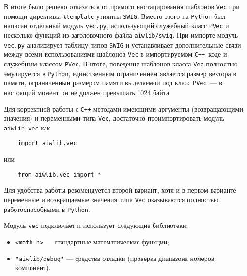 В итоге было решено отказаться от прямого инстацирования шаблонов \verb'Vec' при помощи директивы \verb'%template'
утилиты \verb'SWIG'. Вместо этого на \verb'Python' был написан отдельный модуль \verb'vec.py',
использующий служебный класс \verb'PVec' и несколько функций из заголовочного файла \verb'aiwlib/swig'. 
При импорте модуль \verb'vec.py' анализирует таблицу типов \verb'SWIG' и устанавливает
дополнительные связи между всеми использованиями шаблонов \verb'Vec' в импортируемом \verb'C++'--коде и 
служебным классом \verb'PVec'. В итоге, поведение шаблонов класса \verb'Vec' полностью эмулируется в \verb'Python',
единственным ограничением является размер вектора в памяти, ограниченный размером памяти выделяемой под 
класс \verb'PVec'~--- в настоящий момент он не должен превышать 1024 байта.

Для корректной работы с \verb'C++' методами имеющими аргументы (возвращающими значения) и переменными типа \verb'Vec',
достаточно проимпортировать модуль \verb'aiwlib.vec' как
\begin{verbatim}
    import aiwlib.vec
\end{verbatim}
или
\begin{verbatim}
    from aiwlib.vec import *
\end{verbatim}
Для удобства работы рекомендуется второй вариант, хотя и в первом варианте переменные и возвращаемые значения 
типа \verb'Vec' оказываются полностью работоспособными в \verb'Python'.


Модуль \verb'vec' подключает и использует следующие библиотеки:
\begin{itemize}
\item \verb'<math.h>' --- стандартные математические функции;  
\item \verb'"aiwlib/debug"' --- средства отладки (проверка диапазона номеров компонент).
\end{itemize}
